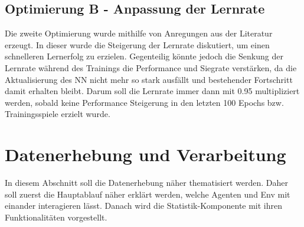 \subsection{Optimierung B - Anpassung der Lernrate} \label{sec:Konzept_Optimierung02}
Die zweite Optimierung wurde mithilfe von Anregungen aus der Literatur \cite[S. 331 f.]{DRL_Lapan} erzeugt. In dieser wurde die Steigerung der Lernrate diskutiert, um einen schnelleren Lernerfolg zu erzielen. Gegenteilig könnte jedoch die Senkung der Lernrate während des Trainings die Performance und Siegrate verstärken, da die Aktualisierung des NN nicht mehr so stark ausfällt und bestehender Fortschritt damit erhalten bleibt. Darum soll die Lernrate immer dann mit 0.95 multipliziert werden, sobald keine Performance Steigerung in den letzten 100 Epochs bzw. Trainingsspiele erzielt wurde.

\section{Datenerhebung und Verarbeitung} \label{sec:Konzept_Datenerhebung_Verarbeitung}
In diesem Abschnitt soll die Datenerhebung näher thematisiert werden. Daher soll zuerst die Hauptablauf näher erklärt werden, welche Agenten und Env mit einander interagieren lässt. Danach wird die Statistik-Komponente mit ihren Funktionalitäten vorgestellt.

